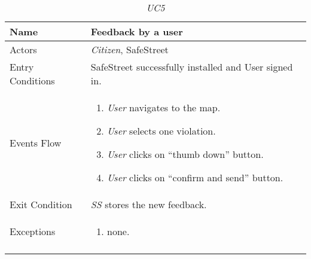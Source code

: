 \documentclass[../../../RASD.tex]{subfiles}
\begin{document}
    \begin{center}
        \begin{longtable}{| p{.35\linewidth} | p{.65\linewidth} |}
            \hline
            \textbf{Name} & \textbf{Feedback by a user}\\ \hline
            Actors & \textit{Citizen}, SafeStreet\\ \hline
            Entry Conditions & SafeStreet successfully installed and User signed in.\\ \hline
            Events Flow &
            \begin{enumerate}
                \item \textit{User} navigates to the map.
                \item \textit{User} selects one violation.
                \item \textit{User} clicks on “thumb down” button.
                \item \textit{User} clicks on “confirm and send” button.
            \end{enumerate}
            \\ \hline
            Exit Condition & \textit{SS} stores the new feedback.\\ \hline
            Exceptions &
            \begin{enumerate}
                \item none.
            \end{enumerate}
            \\
            \hline
            \caption{\textit{UC5}}
        \end{longtable}
    \end{center}
    \newpage
\end{document}
